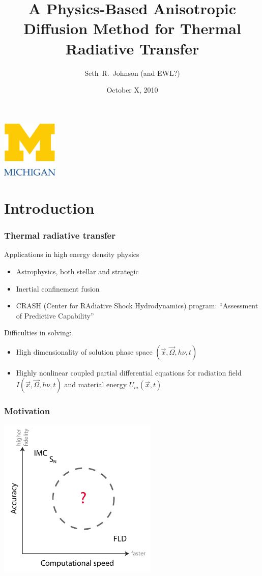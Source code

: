 \documentclass{beamer}
\title[Prospectus]%
{A Physics-Based Anisotropic Diffusion Method for Thermal Radiative
Transfer}
\author[Seth~R.~Johnson]{Seth~R.~Johnson (and EWL?)}
\institute[UMich]{
University of Michigan, Ann Arbor
}
\date[10/X/2010]{October X, 2010}
\begin{document}

\begin{frame}
\titlepage
\begin{center}
  \includegraphics[width=0.2\textwidth]{../figures/umlogo}
\end{center}
\end{frame}

\section{Introduction}
\begin{frame}
  \frametitle{Thermal radiative transfer}
  Applications in high energy density physics
  \begin{itemize}
    \item Astrophysics, both stellar and strategic
    \item Inertial confinement fusion
    \item CRASH (Center for RAdiative Shock Hydrodynamics) program: ``Assessment
          of Predictive Capability''
  \end{itemize}
  Difficulties in solving:
  \begin{itemize}
    \item High dimensionality of solution phase space $(\vec{x}, \vec{\Omega},
      h\nu, t)$
    \item Highly nonlinear coupled partial differential equations for radiation
      field $I(\vec{x}, \vec{\Omega}, h\nu, t)$ and material energy $U_m(\vec{x}, t)$
  \end{itemize}
\end{frame}
\begin{frame}
  \frametitle{Motivation}
\begin{center}
  \includegraphics[width=3in]{../figures/fidelity}
\end{center}
\end{frame}
\end{document}

